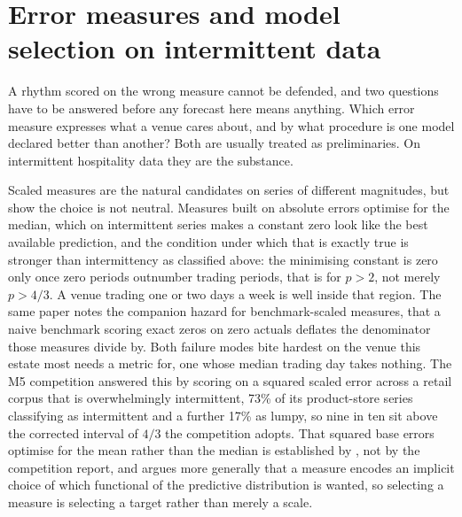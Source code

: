 \section{Error measures and model selection on intermittent data}
\label{sec:rw-ruler}

A rhythm scored on the wrong measure cannot be defended, and two questions have
to be answered before any forecast here means anything. Which error measure
expresses what a venue cares about, and by what procedure is one model declared
better than another? Both are usually treated as preliminaries. On intermittent
hospitality data they are the substance.

Scaled measures are the natural candidates on series of different magnitudes, but
\citet{hewamalage_forecast_2023} show the choice is not neutral. Measures built
on absolute errors optimise for the median, which on intermittent series makes a
constant zero look like the best available prediction, and the condition under
which that is exactly true is stronger than intermittency as classified above:
the minimising constant is zero only once zero periods outnumber trading periods,
that is for $p > 2$, not merely $p > 4/3$. A venue trading one or two days a week
is well inside that region. The same paper notes the companion hazard for
benchmark-scaled measures, that a naive benchmark scoring exact zeros on zero
actuals deflates the denominator those measures divide by. Both failure modes
bite hardest on the venue this estate most needs a metric for, one whose median
trading day takes nothing. The M5 competition
\citep{makridakis_m5_2022} answered this by scoring on a squared scaled error
across a retail corpus that is overwhelmingly intermittent, 73\% of its
product-store series classifying as intermittent and a further 17\% as lumpy, so
nine in ten sit above the corrected \citet{kostenko_note_2006} interval of $4/3$
the competition adopts. That squared base errors optimise for the mean rather
than the median is established by \citet{hewamalage_forecast_2023}, not by the
competition report, and \citet{kolassa_why_2020} argues more generally that a
measure encodes an implicit choice of which functional of the predictive
distribution is wanted, so selecting a measure is selecting a target rather than
merely a scale.

